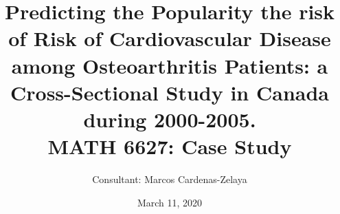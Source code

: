 \documentclass{beamer}
\title[]{Predicting the Popularity  the risk of  Risk of Cardiovascular Disease among Osteoarthritis Patients: a Cross-Sectional Study in Canada during 2000-2005.\\ 
{
\medskip
}
\small MATH 6627: Case Study}
\author{Consultant: Marcos Cardenas-Zelaya} %

{

\medskip

}
\date{March 11, 2020} %
\begin{document}
	
\begin{frame}
	\titlepage 
\end{frame}
	
\end{document}
